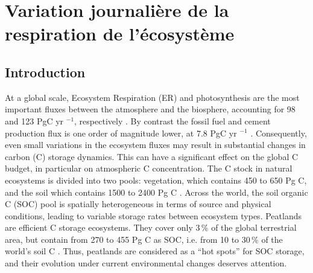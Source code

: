 \singlespacing
\chapter{Variation journalière de la respiration de l'écosystème}
\label{ch:ch5}

\minitoc

\newpage

\doublespacing
\section{Introduction}
At a global scale, Ecosystem Respiration (ER) and photosynthesis are the most important fluxes between the atmosphere and the biosphere, accounting for 98 and 123 PgC yr $^{-1}$, respectively \citep{Bond-Lamberty2010,Beer2010}. 
By contrast the fossil fuel and cement production flux is one order of magnitude lower, at 7.8 PgC yr $^{-1}$ \citep{Ciais2014}.
Consequently, even small variations in the ecosystem fluxes may result in substantial changes in carbon (C) storage dynamics.
This can have a significant effect on the global C budget, in particular on atmospheric C concentration.
The C stock in natural ecosystems is divided into two pools: vegetation, which contains 450 to 650 Pg C, and the soil which contains 1500 to 2400 Pg C \citep{prentice2001,Eswaran1993,batjes1996}.
Across the world, the soil organic C (SOC) pool is spatially heterogeneous in terms of source and physical conditions, leading to variable storage rates between ecosystem types.
Peatlands are efficient C storage ecosystems.
They cover only 3\,\% of the global terrestrial area, but contain from 270 to 455 Pg C as SOC, i.e. from 10 to 30\,\% of the world's soil C \citep{gorham1991, turunen2002}.
Thus, peatlands are considered as a “hot spots” for SOC storage, and their evolution under current environmental changes deserves attention.

